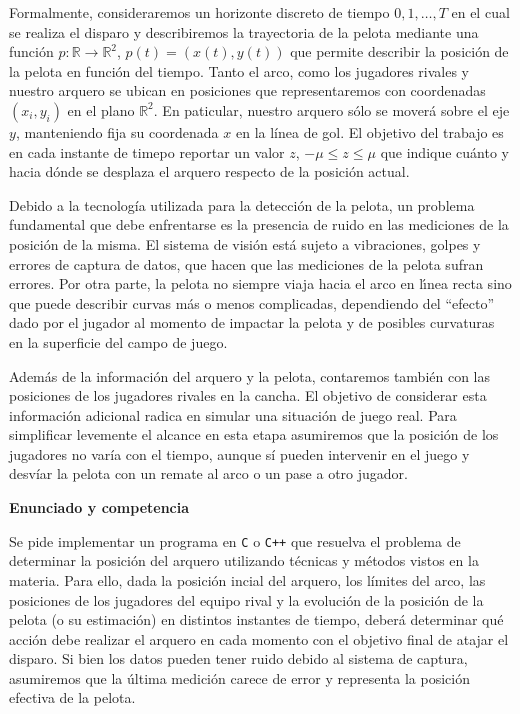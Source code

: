 \documentclass[11pt, a4paper]{article}
\begin{document}
Formalmente, consideraremos un horizonte discreto de tiempo $0, 1, \dots, T$ en el cual se realiza el disparo y describiremos
la trayectoria de la pelota mediante una funci\'on $p:\mathbb{R} \to \mathbb{R}^2$, $p(t) = (x(t),y(t))$ que permite
describir la posici\'on de la pelota en funci\'on del tiempo. Tanto el arco, como los jugadores
rivales y nuestro arquero se ubican en posiciones que representaremos con coordenadas $(x_i,y_i)$ en el plano
$\mathbb{R}^2$. En paticular, nuestro arquero s\'olo se mover\'a sobre el eje $y$, manteniendo fija su coordenada $x$ en
la l\'inea de gol. El objetivo del trabajo es en cada instante de timepo reportar un valor $z$, $-\mu \le z \le \mu$ que
indique cu\'anto y hacia d\'onde se desplaza el arquero respecto de la posici\'on actual.

Debido a la tecnolog\'ia utilizada para la detecci\'on de la pelota, un problema fundamental que debe enfrentarse es la presencia de ruido
en las mediciones de la posici\'on de la misma. El sistema de visi\'on
est\'a sujeto a vibraciones, golpes y errores de captura de datos,
que hacen que las mediciones de la pelota sufran errores.
Por otra parte, la pelota no siempre viaja hacia el arco en l\'\i nea
recta sino que puede describir curvas m\'as o menos complicadas,
dependiendo del ``efecto'' dado por el jugador al momento de impactar
la pelota y de posibles curvaturas en la superficie del campo de juego.

Adem\'as de la informaci\'on del arquero y la pelota, contaremos tambi\'en con las posiciones de los jugadores rivales
en la cancha. El objetivo de considerar esta informaci\'on adicional radica en simular una situaci\'on de juego real.
Para simplificar levemente el alcance en esta etapa asumiremos que la posici\'on de los jugadores no var\'ia con el
tiempo, aunque s\'i pueden intervenir en el juego y desv\'iar la pelota con un remate al arco o un pase a otro jugador.

{\bf\noindent Enunciado y competencia}

Se pide implementar un programa en \verb+C+ o \verb-C++- que resuelva el problema de determinar la posici\'on del
arquero utilizando t\'ecnicas y m\'etodos vistos en la materia. Para ello, dada la posici\'on incial del
arquero, los l\'imites del arco, las posiciones de los jugadores del equipo rival y la evoluci\'on de la posici\'on 
de la pelota (o su estimaci\'on) en distintos instantes de tiempo, deber\'a determinar qu\'e acci\'on debe realizar el
arquero en cada momento con el objetivo final de atajar el disparo. Si bien los datos pueden tener ruido debido al
sistema de captura, asumiremos que la \'ultima medici\'on carece de error y representa la posici\'on efectiva de la
pelota. 
\end{document}
